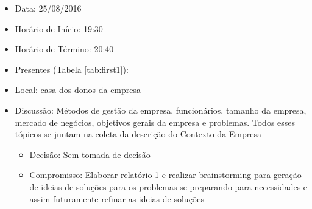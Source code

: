 \begin{itemize}
\item Data: 25/08/2016	
\item Horário de Início: 19:30	
\item Horário de Término: 20:40
\item Presentes (Tabela \ref{tab:first1}):
\begin{table}[!h]
\centering
\caption{Pessoas presentes na primeira reunião}
\label{tab:first1}
\end{table}
\item Local: casa dos donos da empresa
\item Discussão: Métodos de gestão da empresa, funcionários, tamanho da empresa, mercado de negócios, objetivos gerais da empresa e problemas. Todos esses tópicos se juntam na coleta da descrição do Contexto da Empresa
\begin{itemize}
\item Decisão: Sem tomada de decisão
\item Compromisso: Elaborar relatório 1 e realizar brainstorming para geração de ideias de soluções para os problemas se preparando para necessidades e assim futuramente refinar as ideias de soluções
\end{itemize}
\end{itemize}


